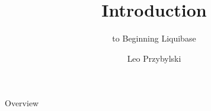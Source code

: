 \documentclass[xcolor=dvipsnames,14pt]{beamer}
\begin{document}
\title{Introduction}
\subtitle{to Beginning Liquibase}
\author[Leo]{Leo Przybylski}

\begin{frame}[plain]
  \titlepage
\end{frame}

\begin{frame}{Overview}
\end{frame}
\end{document}
